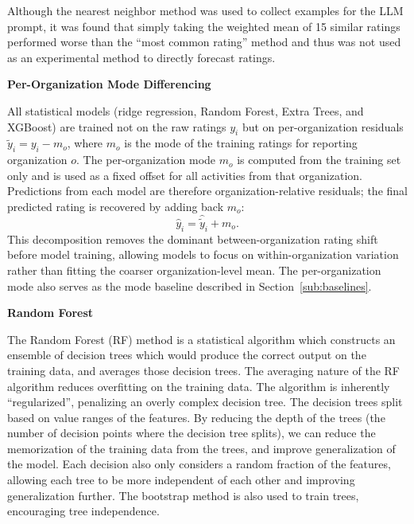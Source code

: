 Although the nearest neighbor method was used to collect examples for the LLM prompt, it was found that simply taking the weighted mean of 15 similar ratings performed worse than the ``most common rating'' method and thus was not used as an experimental method to directly forecast ratings.

\textbf{Per-Organization Mode Differencing}

All statistical models (ridge regression, Random Forest, Extra Trees, and XGBoost) are trained not on the raw ratings $y_i$ but on per-organization residuals $\tilde{y}_i = y_i - m_o$, where $m_o$ is the mode of the training ratings for reporting organization $o$. The per-organization mode $m_o$ is computed from the training set only and is used as a fixed offset for all activities from that organization. Predictions from each model are therefore organization-relative residuals; the final predicted rating is recovered by adding back $m_o$:
\[
\hat{y}_i = \hat{\tilde{y}}_i + m_o .
\]
This decomposition removes the dominant between-organization rating shift before model training, allowing models to focus on within-organization variation rather than fitting the coarser organization-level mean. The per-organization mode also serves as the mode baseline described in Section~\ref{sub:baselines}.

\textbf{Random Forest}

The Random Forest (RF) method is a statistical algorithm which constructs an ensemble of decision trees which would produce the correct output on the training data, and averages those decision trees. The averaging nature of the RF algorithm reduces overfitting on the training data. The algorithm is inherently ``regularized'', penalizing an overly complex decision tree. The decision trees split based on value ranges of the features. By reducing the depth of the trees (the number of decision points where the decision tree splits), we can reduce the memorization of the training data from the trees, and improve generalization of the model. Each decision also only considers a random fraction of the features, allowing each tree to be more independent of each other and improving generalization further. The bootstrap method is also used to train trees, encouraging tree independence.

